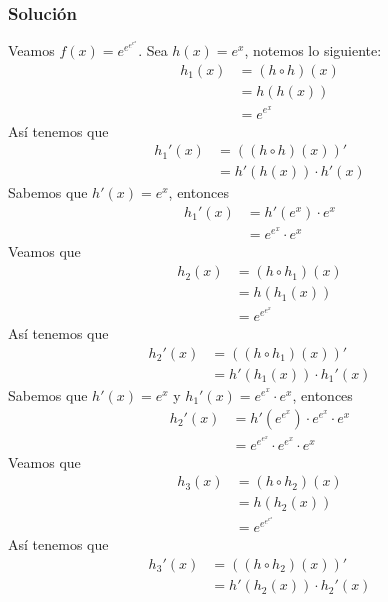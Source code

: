 \documentclass[a4paper]{article}
\begin{document}
\subsubsection*{Solución}
Veamos \(f(x) = e^{e^{e^{e^{x}}}}\).
\newline
Sea \(h(x) = e^{x}\), notemos lo siguiente:
\begin{align*}
    h_{1}\left(x\right) &= \left(h \circ h\right)(x) \\
                        &= h(h(x)) \\ 
                        &= e^{e^{x}}
\end{align*}
Así tenemos que
\begin{align*}
    h_{1}'(x) &= \left(\left(h \circ h\right)(x)\right)' \\
              &= h'(h(x))\cdot h'(x)
\end{align*}
Sabemos que \(h'(x) = e^{x}\), entonces 
\begin{align*}
    h_{1}'(x) &= h'(e^{x}) \cdot e^{x} \\
              &= e^{e^{x}} \cdot e^{x}
\end{align*}
Veamos que 
\begin{align*}
    h_{2}(x) &= \left(h \circ h_{1}\right)(x) \\
          &= h\left(h_{1}(x) \right) \\
          &= e^{e^{e^{x}}}
\end{align*}
Así tenemos que
\begin{align*}
    h_{2}'(x) &= \left(\left(h \circ h_{1}\right)(x)\right)' \\
              &= h'(h_{1}(x))\cdot h_{1}'(x)
\end{align*}
Sabemos que \(h'(x) = e^{x}\) y \(h_{1}'(x) = e^{e^{x}} \cdot e^{x}\), entonces 
\begin{align*}
    h_{2}'(x) &= h'(e^{e^{x}}) \cdot e^{e^{x}} \cdot e^{x} \\
              &= e^{e^{e^{x}}} \cdot e^{e^{x}} \cdot e^{x}
\end{align*}
Veamos que 
\begin{align*}
    h_{3}(x) &= \left(h \circ h_{2}\right)(x) \\
          &= h\left(h_{2}(x) \right) \\
          &= e^{e^{e^{e^{x}}}}
\end{align*}
Así tenemos que
\begin{align*}
    h_{3}'(x) &= \left(\left(h \circ h_{2}\right)(x)\right)' \\
              &= h'(h_{2}(x))\cdot h_{2}'(x) \\
\end{align*}
\end{document}
